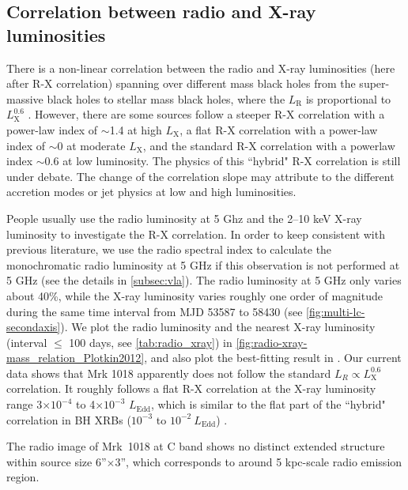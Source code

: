 \documentclass[twocolumn]{aastex63}
\begin{document}
\subsection{Correlation between radio and X-ray luminosities}
There is a non-linear correlation between the radio and X-ray luminosities (here after R-X correlation) spanning over different mass black holes from the super-massive black holes to stellar mass black holes, where the $L_\mathrm{R}$ is proportional to $L_\mathrm{X}^{0.6}$ \citep{2003MNRAS.345.1057M,2004A&A...414..895F}. However, there are some sources follow a steeper R-X correlation with a power-law index of $\sim$1.4 at high $L_\mathrm{X}$, a flat R-X correlation with a power-law index of  $\sim$0 at moderate $L_\mathrm{X}$, and the standard R-X correlation with a powerlaw index $\sim$0.6 \cite[e.g. ][]{2011MNRAS.414..677C,2016MNRAS.463.2287X} at low luminosity. The physics of this ``hybrid" R-X correlation is still under debate. The change of the correlation slope may attribute to the different accretion modes or jet physics at low and high luminosities\citep{2016MNRAS.456.4377X,2018MNRAS.481.4513I,2018MNRAS.473.4122E}. 

People usually use the radio luminosity at 5 Ghz and the 2--10 keV X-ray luminosity to investigate the R-X correlation. In order to keep consistent with previous literature, we use the radio spectral index to calculate the monochromatic radio luminosity at 5 GHz if this observation is not performed at 5 GHz (see the details in \autoref{subsec:vla}). The radio luminosity at 5 GHz only varies about 40\%, while the X-ray luminosity varies roughly one order of magnitude during the same time interval from MJD 53587 to 58430 (see \autoref{fig:multi-lc-secondaxis}). We plot the radio luminosity and the nearest X-ray luminosity (interval $\le$ 100 days, see \autoref{tab:radio_xray}) in \autoref{fig:radio-xray-mass_relation_Plotkin2012}, and also plot the best-fitting result in \citet{2012MNRAS.419..267P}. Our current data shows that Mrk 1018 apparently does not follow the standard $L_{R}\propto L_\mathrm{X}^{0.6}$ correlation. It roughly follows a flat R-X correlation at the X-ray luminosity range 3$\times 10^{-4}$ to 4$\times 10^{-3}$ $L_\mathrm{Edd}$, which is similar to the flat part of the ``hybrid" correlation in BH XRBs ($10^{-3}$ to $10^{-2}~L_\mathrm{Edd}$) \citep[see e.g. ][]{2018MNRAS.473.4122E,2020ApJ...891...31X}. 


The radio image of Mrk~1018 at C band shows no distinct extended structure within source size  6''$\times$3'', which corresponds to around 5 kpc-scale radio emission region.
\end{document}
